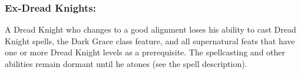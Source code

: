 \subsubsection{Ex-Dread Knights:}
A Dread Knight who changes to a good alignment loses his ability to cast Dread Knight spells, 
the Dark Grace class feature, 
and all supernatural feats that have one or more Dread Knight levels as a prerequisite.
The spellcasting and other abilities remain dormant until he atones (see the  spell description).


